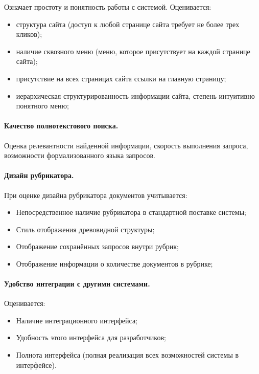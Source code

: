 Означает простоту и понятность работы с системой. Оценивается:
\begin{itemize}
\item структура сайта (доступ к любой странице сайта требует не более трех кликов);
\item наличие сквозного меню (меню, которое присутствует на каждой странице сайта);
\item присутствие на всех страницах сайта ссылки на главную страницу;
\item иерархическая структурированность информации сайта, степень интуитивно понятного меню;
\end{itemize}

\paragraph{Качество полнотекстового поиска.}
Оценка релевантности найденной информации, скорость выполнения запроса, возможности формализованного языка запросов.

\paragraph{Дизайн рубрикатора.}
При оценке дизайна рубрикатора документов учитывается:
\begin{itemize}
\item Непосредственное наличие рубрикатора в стандартной поставке системы;
\item Стиль отображения древовидной структуры;
\item Отображение сохранённых запросов внутри рубрик;
\item Отображение информации о количестве документов в рубрике;
\end{itemize}

\paragraph{Удобство интеграции с другими системами.} 
Оценивается:
\begin{itemize}
\item Наличие интеграционного интерфейса;
\item Удобность этого интерфейса для разработчиков;
\item Полнота интерфейса (полная реализация всех возможностей системы в интерфейсе).
\end{itemize}

